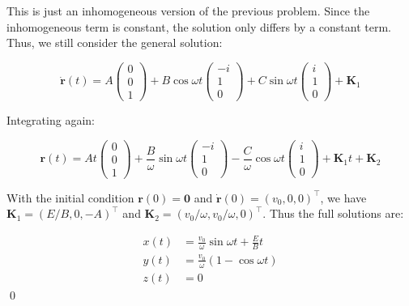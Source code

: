\documentclass[12pt]{article}
\begin{document}
This is just an inhomogeneous version of the previous problem. Since the inhomogeneous term is constant, the solution only differs by a constant term. Thus, we still consider the general solution:

\begin{equation}
    \dot{\mathbf{r}}(t) = 
    A
    \begin{pmatrix}
        0 \\
        0 \\
        1
    \end{pmatrix}
    +
    B \cos{\omega t}
    \begin{pmatrix}
        -i \\
        1 \\
        0
    \end{pmatrix}
    +
    C \sin{\omega t}
    \begin{pmatrix}
        i \\
        1 \\
        0
    \end{pmatrix}
    +
    \mathbf{K}_{1}
\end{equation}

Integrating again:

\begin{equation}
    \mathbf{r}(t) = 
    At
    \begin{pmatrix}
        0 \\
        0 \\
        1
    \end{pmatrix}
    +
    \frac{B}{\omega} \sin{\omega t}
    \begin{pmatrix}
        -i \\
        1 \\
        0
    \end{pmatrix}
    -
    \frac{C}{\omega} \cos{\omega t}
    \begin{pmatrix}
        i \\
        1 \\
        0
    \end{pmatrix}
    +
    \mathbf{K}_{1}t
    +
    \mathbf{K}_{2}
\end{equation}

With the initial condition $\mathbf{r}(0) = \mathbf{0}$ and $\dot{\mathbf{r}}(0) = (v_0, 0, 0)^{\intercal}$, we have $\mathbf{K}_{1} = (E/B, 0, -A)^{\intercal}$ and $\mathbf{K}_{2} = (v_{0}/\omega, v_{0}/\omega, 0)^{\intercal}$. Thus the full solutions are:

\begin{equation}
\begin{split}
    x(t) &= \frac{v_{0}}{\omega} \sin{\omega t} + \frac{E}{B} t\\
    y(t) &= \frac{v_{0}}{\omega} (1 - \cos{\omega t}) \\
    z(t) &= 0
\end{split}
\end{equation}
\qed
\end{document}

